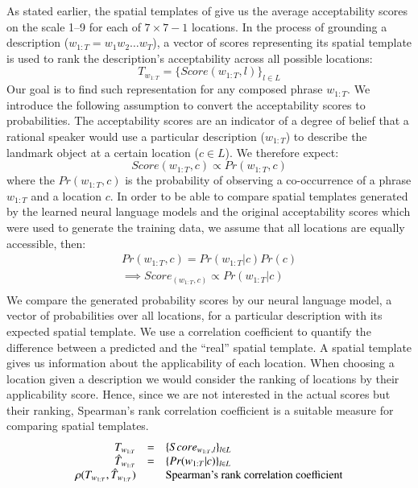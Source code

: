 As stated earlier, the spatial templates of \cite{logan1996computational} give
us the average acceptability scores on the scale 1--9 for each of $7 \times 7 - 1$
locations. In the process of grounding a description ($w_{1:T} = w_1 w_2 \ldots
w_T$), a vector of scores representing its spatial template is used to rank
the description's acceptability across all possible locations:
\begin{equation}
T_{w_{1:T}} = \{Score(w_{1:T}, l)\}_{l \in L}
\end{equation}
Our goal is to find such representation for any composed phrase $w_{1:T}$.
We introduce the following assumption to convert the acceptability scores to probabilities. The
acceptability scores are an indicator of a degree of belief \cite{ramsey1931truth}
that a rational speaker would use a particular description ($w_{1:T}$) to
describe the landmark object at a certain location ($c \in L$). We therefore expect:
\begin{equation}\label{iwcs2017:eq:rational}
  Score(w_{1:T}, c) \propto Pr(w_{1:T}, c)
\end{equation}
\noindent where the $Pr(w_{1:T}, c)$ is the probability of observing a co-occurrence of a
phrase $w_{1:T}$ and a location $c$. In order to be able to compare spatial
templates generated by the learned neural language models and the original acceptability scores
which were used to generate the training data, we assume that all locations are
equally accessible, then:
\begin{equation}\begin{array}{l}
   Pr(w_{1:T}, c) = Pr(w_{1:T} | c) Pr(c) \\
   \implies Score_(w_{1:T}, c) \propto Pr(w_{1:T} | c) \\
\end{array}
\end{equation}
We compare the generated probability scores by our neural language model, a vector of
probabilities over all locations, for a particular description with its expected spatial
template. We use a correlation coefficient to quantify the difference between
a predicted and the ``real'' spatial template. A
spatial template gives us information about the applicability of each location.
When choosing a location given a description we would consider the ranking of
locations by their applicability score. Hence, since we are not interested in
the actual scores but their ranking, Spearman's rank correlation coefficient is
a suitable measure for comparing spatial templates.
\begin{equation}\label{iwcs2017:eq:sptemp}\begin{array}{r c l}
T_{w_{1:T}} &=& \{Score_{w_{1:T}, l}\}_{l \in L} \\
\hat{T}_{w_{1:T}} &=& \{Pr(w_{1:T} | c) \}_{l \in L} \\
\rho(T_{w_{1:T}}, \hat{T}_{w_{1:T}}) & &\textrm{Spearman's rank correlation
coefficient}
\end{array}
\end{equation}
